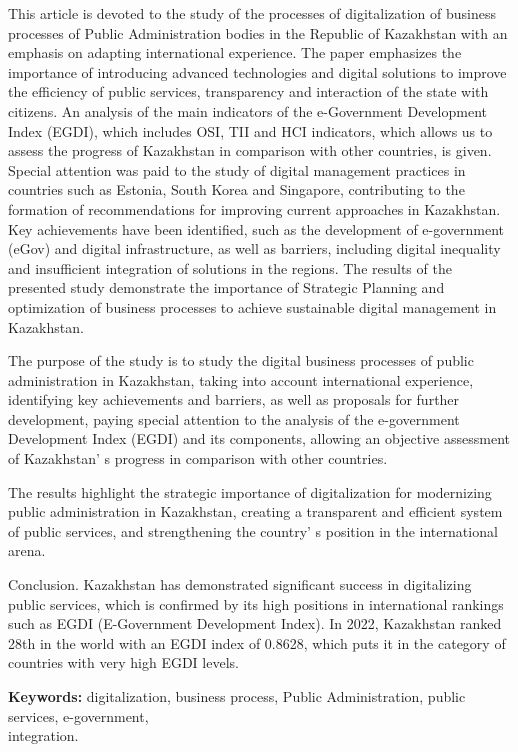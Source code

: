 This article is devoted to the study of the processes of digitalization
of business processes of Public Administration bodies in the Republic of
Kazakhstan with an emphasis on adapting international experience. The
paper emphasizes the importance of introducing advanced technologies and
digital solutions to improve the efficiency of public services,
transparency and interaction of the state with citizens. An analysis of
the main indicators of the e-Government Development Index (EGDI), which
includes OSI, TII and HCI indicators, which allows us to assess the
progress of Kazakhstan in comparison with other countries, is given.
Special attention was paid to the study of digital management practices
in countries such as Estonia, South Korea and Singapore, contributing to
the formation of recommendations for improving current approaches in
Kazakhstan. Key achievements have been identified, such as the
development of e-government (eGov) and digital infrastructure, as well
as barriers, including digital inequality and insufficient integration
of solutions in the regions. The results of the presented study
demonstrate the importance of Strategic Planning and optimization of
business processes to achieve sustainable digital management in
Kazakhstan.

The purpose of the study is to study the digital business processes of
public administration in Kazakhstan, taking into account international
experience, identifying key achievements and barriers, as well as
proposals for further development, paying special attention to the
analysis of the e-government Development Index (EGDI) and its
components, allowing an objective assessment of
Kazakhstan' s progress in comparison with other
countries.

The results highlight the strategic importance of digitalization for
modernizing public administration in Kazakhstan, creating a transparent
and efficient system of public services, and strengthening the
country' s position in the international arena.

Conclusion. Kazakhstan has demonstrated significant success in
digitalizing public services, which is confirmed by its high positions
in international rankings such as EGDI (E-Government Development Index).
In 2022, Kazakhstan ranked 28th in the world with an EGDI index of
0.8628, which puts it in the category of countries with very high EGDI
levels.

{\bfseries Keywords:} digitalization, business process, Public
Administration, public services, e-government, \\integration.

